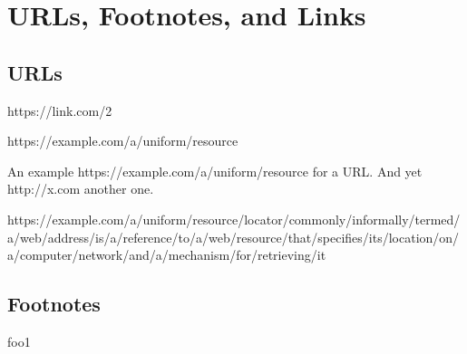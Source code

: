 


\vspace{\myLineheight}\begin{multicols}{2}\raggedcolumns{}

\end{multicols}


\section{URLs, Footnotes, and Links
}


\vspace{\myLineheight}\begin{multicols}{2}\raggedcolumns{}
\subsection{URLs
}
{\mktsStyleUrl{}https:\g/\g/\g\allowbreak{}link.com/2}

{\mktsStyleUrl{}https:\g/\g/\g\allowbreak{}example.com\g/\g\allowbreak{}a\g/\g\allowbreak{}uniform\g/\g\allowbreak{}resource}

An example {\mktsStyleUrl{}https:\g/\g/\g\allowbreak{}example.com\g/\g\allowbreak{}a\g/\g\allowbreak{}uniform\g/\g\allowbreak{}resource} for a URL.
And yet {\mktsStyleUrl{}http:\g/\g/\g\allowbreak{}x.com} another one.

{\mktsStyleUrl{}https:\g/\g/\g\allowbreak{}example.com\g/\g\allowbreak{}a\g/\g\allowbreak{}uniform\g/\g\allowbreak{}resource\g/\g\allowbreak{}locator\g/\g\allowbreak{}commonly\g/\g\allowbreak{}informally\g/\g\allowbreak{}termed\g/\g\allowbreak{}a\g/\g\allowbreak{}web\g/\g\allowbreak{}address\g/\g\allowbreak{}is\g/\g\allowbreak{}a\g/\g\allowbreak{}reference\g/\g\allowbreak{}to\g/\g\allowbreak{}a\g/\g\allowbreak{}web\g/\g\allowbreak{}resource\g/\g\allowbreak{}that\g/\g\allowbreak{}specifies\g/\g\allowbreak{}its\g/\g\allowbreak{}location\g/\g\allowbreak{}on\g/\g\allowbreak{}a\g/\g\allowbreak{}computer\g/\g\allowbreak{}network\g/\g\allowbreak{}and\g/\g\allowbreak{}a\g/\g\allowbreak{}mechanism\g/\g\allowbreak{}for\g/\g\allowbreak{}retrieving\g/\g\allowbreak{}it}


\subsection{Footnotes
}
foo{\mktsEnStyleMarkMain{}1}



\end{multicols}
